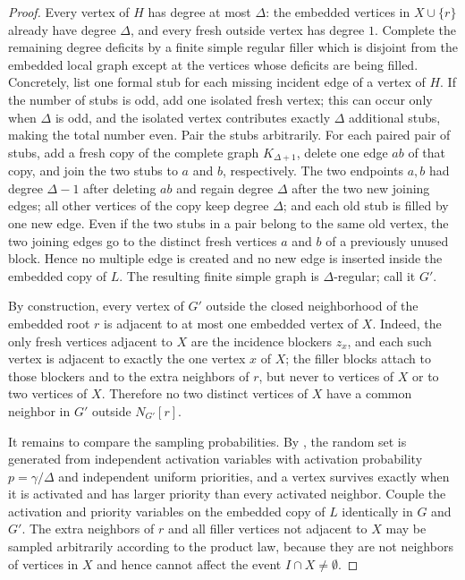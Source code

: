 \begin{proof}
Every vertex of $H$ has degree at most $\Delta$: the embedded vertices in
$X\cup\{r\}$ already have degree $\Delta$, and every fresh outside vertex has
degree $1$.  Complete the remaining degree deficits by a finite simple
regular filler which is disjoint from the embedded local graph except at the
vertices whose deficits are being filled.  Concretely, list one formal stub
for each missing incident edge of a vertex of $H$.  If the number of stubs is
odd, add one isolated fresh vertex; this can occur only when $\Delta$ is odd,
and the isolated vertex contributes exactly $\Delta$ additional stubs, making
the total number even.  Pair the stubs arbitrarily.  For each paired pair of
stubs, add a fresh copy of the complete graph
$K_{\Delta+1}$, delete one edge $ab$ of that copy, and join the two stubs to
$a$ and $b$, respectively.  The two endpoints $a,b$ had degree $\Delta-1$
after deleting $ab$ and regain degree $\Delta$ after the two new joining
edges; all other vertices of the copy keep degree $\Delta$; and each old
stub is filled by one new edge.  Even if the two stubs in a pair belong to
the same old vertex, the two joining edges go to the distinct fresh vertices
$a$ and $b$ of a previously unused block.  Hence no multiple edge is created
and no new edge is inserted inside the embedded copy of $L$.  The resulting
finite simple graph is $\Delta$-regular; call it $G'$.

By construction, every vertex of $G'$ outside the closed neighborhood of the
embedded root $r$ is adjacent to at most one embedded vertex of $X$.  Indeed,
the only fresh vertices adjacent to $X$ are the incidence blockers $z_x$, and
each such vertex is adjacent to exactly the one vertex $x$ of $X$; the filler
blocks attach to those blockers and to the extra neighbors of $r$, but never
to vertices of $X$ or to two vertices of $X$.  Therefore no two distinct
vertices of $X$ have a common neighbor in $G'$ outside $N_{G'}[r]$.

It remains to compare the sampling probabilities.  By
, the random set is generated from
independent activation variables with activation probability
$p=\gamma/\Delta$ and independent uniform priorities, and a vertex survives
exactly when it is activated and has larger priority than every activated
neighbor.  Couple the activation and priority variables on the embedded copy
of $L$ identically in $G$ and $G'$.  The extra neighbors of $r$ and all filler
vertices not adjacent to $X$ may be sampled arbitrarily according to the
product law, because they are not neighbors of vertices in $X$ and hence
cannot affect the event $I\cap X\ne\emptyset$.


\end{proof}
